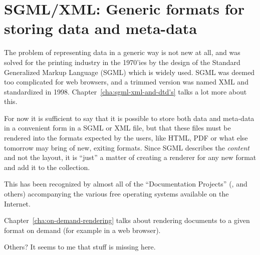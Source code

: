 \section{SGML/XML:  Generic formats for storing data and meta-data}
\label{sec:sgml-and-xml-generic-formats}

The problem of representing data in a generic way is not new at all,
and was solved for the printing industry in the 1970'ies by the design
of the Standard Generalized Markup Language (SGML) which is widely
used.  SGML was deemed too complicated for web browsers, and a trimmed
version was named XML and standardized in 1998.
Chapter~\vref{cha:sgml-xml-and-dtd's} talks a lot more about this.

For now it is sufficient to say that it is possible to store both data
and meta-data in a convenient form in a SGML or XML file, but that
these files must be rendered into the formats expected by the users,
like HTML, PDF or what else tomorrow may bring of new, exiting
formats.  Since SGML describes the \textit{content} and not the
layout, it is ``just'' a matter of creating a renderer for any new
format and add it to the collection.

This has been recognized by almost all of the ``Documentation
Projects'' (,  and others) accompanying the various
free operating systems available on the Internet.


Chapter~\vref{cha:on-demand-rendering} talks about rendering documents
to a given format on demand (for example in a web browser).

\textsf{Others? It seems to me that stuff is missing here.} 





